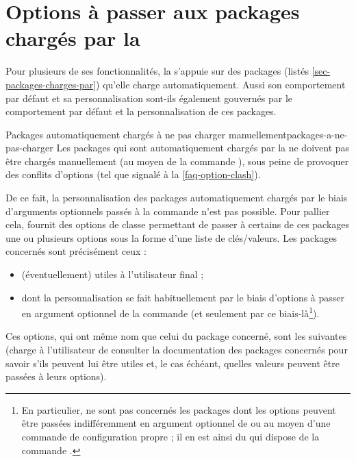 \section{Options à passer aux packages chargés par la \yatCl}
\label{sec-options-passer-aux}%
%

%
%
Pour plusieurs de ses fonctionnalités, la \yatCl s'appuie sur des packages
(listés \vref{sec-packages-charges-par}) qu'elle charge automatiquement. Aussi
son comportement par défaut et sa personnalisation sont-ils également gouvernés
par le comportement par défaut et la personnalisation de ces packages.

\begin{dbwarning}{Packages automatiquement chargés à ne pas charger
    manuellement}{packages-a-ne-pas-charger}
  Les packages qui sont automatiquement chargés par la \yatCl{} ne doivent pas
  être chargés manuellement (au moyen de la commande
  ), sous peine de provoquer des conflits d'options
  (tel que signalé à la \vref{faq-option-clash}).
\end{dbwarning}

De ce fait, la personnalisation des packages automatiquement chargés par le
biais d'arguments optionnels passés à la commande 
n'est pas possible. Pour pallier cela, \yat{} fournit des options de classe
permettant de passer à certains de ces packages une ou plusieurs options sous
la forme d'une liste de clés/valeurs. Les packages concernés sont précisément
ceux :
\begin{itemize}
\item (éventuellement) utiles à l'utilisateur final ;
\item dont la personnalisation se fait habituellement par le biais d'options
  à passer en argument optionnel de la commande  (et
  seulement par ce biais-là\footnote{En particulier, ne sont pas concernés les
    packages dont les options peuvent être passées indifféremment en argument
    optionnel de \protect{} ou au moyen d'une commande
    de configuration propre ; il en est ainsi du  qui dispose
    de la commande \protect{}.}).
\end{itemize}
Ces options, qui ont même nom que celui du package concerné, sont les suivantes
(charge à l'utilisateur de consulter la documentation des packages concernés
pour savoir s'ils peuvent lui être utiles et, le cas échéant, quelles valeurs
peuvent être passées à leurs options).

